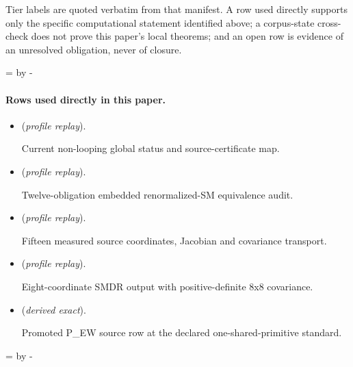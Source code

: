 \documentclass[11pt]{article}
\begin{document}
Tier labels are quoted verbatim from that manifest. A row used directly supports only the specific computational statement identified above; a corpus-state cross-check does not prove this paper's local theorems; and an open row is evidence of an unresolved obligation, never of closure.

\par\begingroup{}=\pagegoal\advance{} by -\pagetotal\ifdim\dimen0<7\baselineskip\newpage\fi\endgroup
\paragraph{Rows used directly in this paper.}
\begin{itemize}
\setlength{\itemsep}{0.25em}
\item {} (\emph{profile replay}).\par Current non-looping global status and source-certificate map.
\item {} (\emph{profile replay}).\par Twelve-obligation embedded renormalized-SM equivalence audit.
\item {} (\emph{profile replay}).\par Fifteen measured source coordinates, Jacobian and covariance transport.
\item {} (\emph{profile replay}).\par Eight-coordinate SMDR output with positive-definite 8x8 covariance.
\item {} (\emph{derived exact}).\par Promoted P\_EW source row at the declared one-shared-primitive standard.
\end{itemize}

\par\begingroup{}=\pagegoal\advance{} by -\pagetotal\ifdim\dimen0<7\baselineskip\newpage\fi\endgroup
\end{document}

